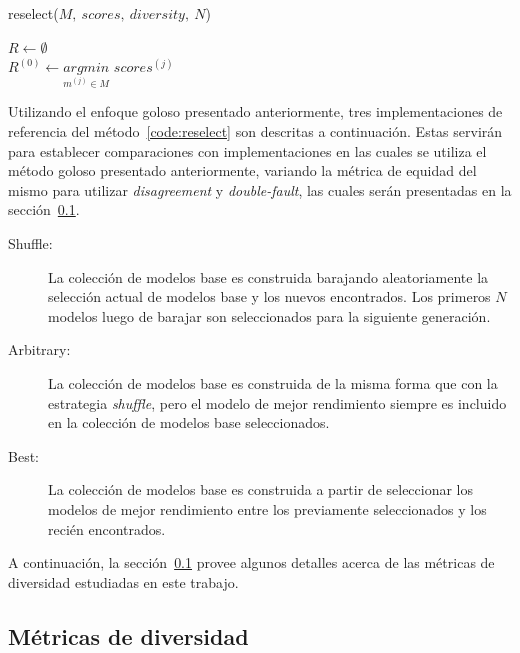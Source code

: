 \begin{algorithm}[!ht]
    \caption{reselect($M,\ scores,\ diversity,\ N$)\label{code:reselect}}

    \init $R \leftarrow \emptyset$ \\
    \init $R^{(0)} \leftarrow \underset{m^{(j)} \in M}{argmin}$ $scores^{(j)}$ \\

\end{algorithm}

Utilizando el enfoque goloso presentado anteriormente, tres implementaciones de referencia del método~\ref{code:reselect} son descritas a continuación.
Estas servirán para establecer comparaciones con implementaciones en las cuales se utiliza el método goloso presentado anteriormente, variando la métrica de equidad del mismo para utilizar \textit{disagreement} y \textit{double-fault}, las cuales serán presentadas en la sección~\ref{section:diversity-meassures}.

\begin{description}
    \item[Shuffle:]
    La colección de modelos base es construida barajando aleatoriamente la selección actual de modelos base y los nuevos encontrados.
    Los primeros $N$ modelos luego de barajar son seleccionados para la siguiente generación.
    \item[Arbitrary:]
    La colección de modelos base es construida de la misma forma que con la estrategia \textit{shuffle}, pero el modelo de mejor rendimiento siempre es incluido en la colección de modelos base seleccionados.
    \item[Best:]
    La colección de modelos base es construida a partir de seleccionar los modelos de mejor rendimiento entre los previamente seleccionados y los recién encontrados.
\end{description}

A continuación, la sección~\ref{section:diversity-meassures} provee algunos detalles acerca de las métricas de diversidad estudiadas en este trabajo.

\subsection{Métricas de diversidad}\label{section:diversity-meassures}

